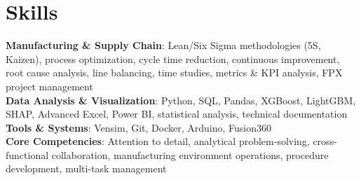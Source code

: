 \documentclass[letterpaper,11pt]{article}
\begin{document}
\section{Skills}
 \begin{itemize}[leftmargin=0.15in, label={}]
    \small{\item{
     \textbf{Manufacturing \& Supply Chain}{: Lean/Six Sigma methodologies (5S, Kaizen), process optimization, cycle time reduction, continuous improvement, root cause analysis, line balancing, time studies, metrics \& KPI analysis, FPX project management} \\
     \textbf{Data Analysis \& Visualization}{: Python, SQL, Pandas, XGBoost, LightGBM, SHAP, Advanced Excel, Power BI, statistical analysis, technical documentation} \\
     \textbf{Tools \& Systems}{: Vensim, Git, Docker, Arduino, Fusion360} \\
     \textbf{Core Competencies}{: Attention to detail, analytical problem-solving, cross-functional collaboration, manufacturing environment operations, procedure development, multi-task management}
    }}
 \end{itemize}

\end{document}
